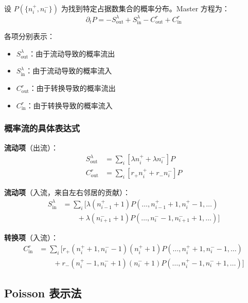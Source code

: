 设 $P(\{n_i^+, n_i^-\})$ 为找到特定占据数集合的概率分布。Master 方程为：
\begin{equation}\label{eq:master-eq}
\partial_t P = -S^\lambda_{\text{out}} + S^\lambda_{\text{in}} - C^r_{\text{out}} + C^r_{\text{in}}
\end{equation}

各项分别表示：
\begin{itemize}
    \item $S^\lambda_{\text{out}}$：由于流动导致的概率流出
    \item $S^\lambda_{\text{in}}$：由于流动导致的概率流入
    \item $C^r_{\text{out}}$：由于转换导致的概率流出
    \item $C^r_{\text{in}}$：由于转换导致的概率流入
\end{itemize}

\subsubsection{概率流的具体表达式}

\textbf{流动项}（出流）：
\begin{align}
S^\lambda_{\text{out}} &= \sum_i \left[\lambda n_i^+ + \lambda n_i^-\right] P \label{eq:stream-out}\\
C^r_{\text{out}} &= \sum_i \left[r_+ n_i^+ + r_- n_i^-\right] P \label{eq:conv-out}
\end{align}

\textbf{流动项}（入流，来自左右邻居的贡献）：
\begin{align}
S^\lambda_{\text{in}} &= \sum_i \Big[\lambda(n_{i-1}^+ + 1)P(\ldots, n_{i-1}^+ + 1, n_i^+ - 1, \ldots) \nonumber\\
&\qquad + \lambda(n_{i+1}^- + 1)P(\ldots, n_i^- - 1, n_{i+1}^- + 1, \ldots)\Big] \label{eq:stream-in}
\end{align}

\textbf{转换项}（入流）：
\begin{align}
C^r_{\text{in}} &= \sum_i \Big[r_+(n_i^+ + 1, n_i^- - 1)(n_i^+ + 1)P(\ldots, n_i^+ + 1, n_i^- - 1, \ldots) \nonumber\\
&\qquad + r_-(n_i^+ - 1, n_i^- + 1)(n_i^- + 1)P(\ldots, n_i^+ - 1, n_i^- + 1, \ldots)\Big] \label{eq:conv-in}
\end{align}

\subsection{Poisson 表示法}\label{subsec:poisson-rep}

